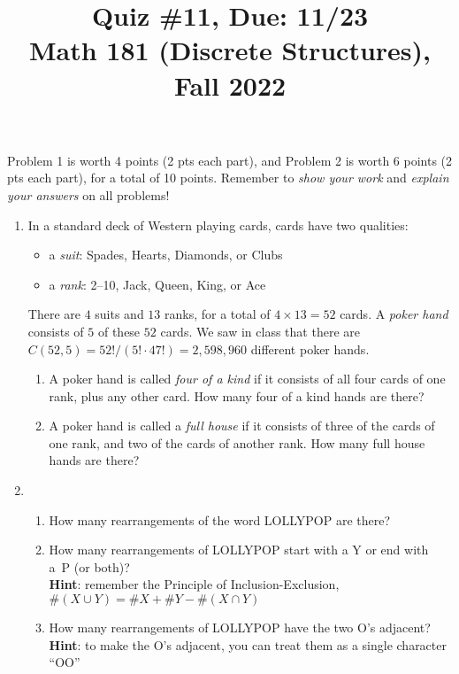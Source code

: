 \documentclass[11pt]{article}
\title{Quiz \#11, Due: 11/23 \\Math 181 (Discrete Structures), Fall 2022}
\date{}
\begin{document}
\maketitle

\thispagestyle{empty}

\vspace{-1cm}

Problem 1 is worth 4 points (2 pts each part), and Problem 2 is worth 6 points (2 pts each part), for a total of 10 points. Remember to \emph{show your work} and \emph{explain your answers} on all problems!

\begin{enumerate}

\item In a standard deck of Western playing cards, cards have two qualities:
\begin{itemize}
\item a \emph{suit}: Spades, Hearts, Diamonds, or Clubs
\item a \emph{rank}: 2--10, Jack, Queen, King, or Ace
\end{itemize}
There are $4$ suits and $13$ ranks, for a total of $4\times 13=52$ cards. A \emph{poker hand} consists of $5$ of these $52$ cards. We saw in class that there are $C(52,5) = 52!/(5! \cdot 47!)=2,598,960$ different poker hands.
\begin{enumerate}
\item A poker hand is called \emph{four of a kind} if it consists of all four cards of one rank, plus any other card. How many four of a kind hands are there?
\item A poker hand is called a \emph{full house} if it consists of three of the cards of one rank, and two of the cards of another rank. How many full house hands are there?
\end{enumerate}

\item \begin{enumerate}
\item How many rearrangements of the word LOLLYPOP are there?
\item How many rearrangements of LOLLYPOP start with a Y or end with a~P (or both)? \\ {\bf Hint}: remember the Principle of Inclusion-Exclusion, $\#(X\cup Y) = \#X + \#Y - \#(X\cap Y)$
\item How many rearrangements of LOLLYPOP have the two O's adjacent? \\ {\bf Hint}: to make the O's adjacent, you can treat them as a single character ``OO''
\end{enumerate}

\end{enumerate}
\end{document}
